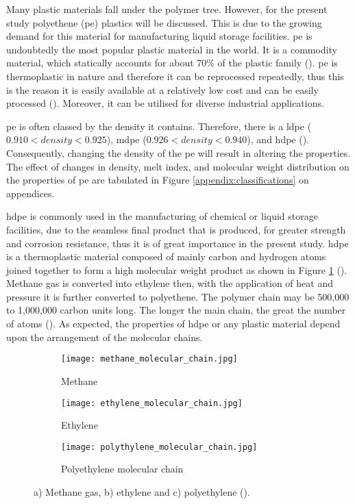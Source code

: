 Many plastic materials fall under the polymer tree. However, for the present study polyethene (\acrshort{pe}) plastics will be discussed. This is due to the growing demand for this material for manufacturing liquid storage facilities. \acrshort{pe} is undoubtedly the most popular plastic material in the world. It is a commodity material, which statically accounts for about 70\% of the plastic family (\cite{roslan2013effect}).  \acrshort{pe} is thermoplastic in nature and therefore it can be reprocessed repeatedly, thus this is the reason it is easily available at a relatively low cost and can be easily processed (\cite{kurtz2009cross}). Moreover, it can be utilised for diverse industrial applications. 

\acrshort{pe} is often classed by the density it contains. Therefore, there is a \Acrfull{ldpe} ($0.910 < density < 0.925$), \Acrfull{mdpe} ($0.926 < density < 0.940$), and \Acrfull{hdpe} (\cite{gabriel1998history}). Consequently, changing the density of the \acrshort{pe} will result in altering the properties. The effect of changes in density, melt index, and molecular weight distribution on the properties of \acrshort{pe} are tabulated in Figure \ref{appendix:classifications} on appendices.

\acrshort{hdpe} is commonly used in the manufacturing of chemical or liquid storage facilities, due to the seamless final product that is produced, for greater strength and corrosion resistance, thus it is of great importance in the present study. \acrshort{hdpe} is a thermoplastic material composed of mainly carbon and hydrogen atoms joined together to form a high molecular weight product as shown in Figure \ref{ch3:figure:molecular_chains} (\cite{gabriel1998history}). Methane gas is converted into ethylene then, with the application of heat and pressure it is further converted to polyethene. The polymer chain may be 500,000 to 1,000,000 carbon units long. The longer the main chain, the great the number of atoms (\cite{gabriel1998history}). As expected, the properties of \acrshort{hdpe} or any plastic material depend upon the arrangement of the molecular chains.
               
\begin{figure}[H]
\centering

\begin{subfigure}{.3\textwidth}
    \centering
    \texttt{[image: methane\_molecular\_chain.jpg]}
    \caption{Methane}
\end{subfigure}
\begin{subfigure}{.3\textwidth}
    \centering
    \texttt{[image: ethylene\_molecular\_chain.jpg]}
    \caption{Ethylene}
\end{subfigure}
\begin{subfigure}{.65\textwidth}
    \vspace{1.5em}
    \centering
    \texttt{[image: polythylene\_molecular\_chain.jpg]}
    \caption{Polyethylene molecular chain}
\end{subfigure}

\caption{a) Methane gas, b) ethylene and c) polyethylene (\cite{gabriel1998history}).}
\label{ch3:figure:molecular_chains}
\end{figure}

